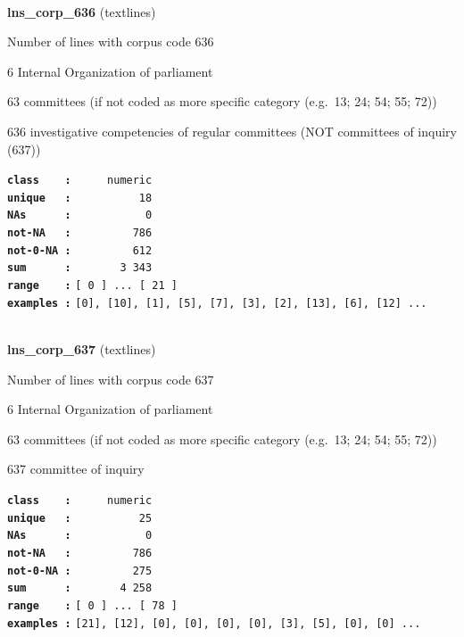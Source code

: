 \documentclass[]{article}
\begin{document}
~

\textbf{lns\_corp\_636} (textlines)

Number of lines with corpus code 636

6 Internal Organization of parliament

63 committees (if not coded as more specific category (e.g.~13; 24; 54;
55; 72))

636 investigative competencies of regular committees (NOT committees of
inquiry (637))

\textbf{\texttt{class\ \ \ \ :}} \texttt{~~~~~numeric}\\
\textbf{\texttt{unique\ \ \ :}} \texttt{~~~~~~~~~~18}\\
\textbf{\texttt{NAs\ \ \ \ \ \ :}} \texttt{~~~~~~~~~~~0}\\
\textbf{\texttt{not-NA\ \ \ :}} \texttt{~~~~~~~~~786}\\
\textbf{\texttt{not-0-NA\ :}} \texttt{~~~~~~~~~612}\\
\textbf{\texttt{sum\ \ \ \ \ \ :}} \texttt{~~~~~~~3~343}\\
\textbf{\texttt{range\ \ \ \ :}}
\texttt{{[}\ 0\ {]}\ ...\ {[}\ 21\ {]}}\\
\textbf{\texttt{examples\ :}}
\texttt{{[}0{]},\ {[}10{]},\ {[}1{]},\ {[}5{]},\ {[}7{]},\ {[}3{]},\ {[}2{]},\ {[}13{]},\ {[}6{]},\ {[}12{]}\ ...}\\

~

\textbf{lns\_corp\_637} (textlines)

Number of lines with corpus code 637

6 Internal Organization of parliament

63 committees (if not coded as more specific category (e.g.~13; 24; 54;
55; 72))

637 committee of inquiry

\textbf{\texttt{class\ \ \ \ :}} \texttt{~~~~~numeric}\\
\textbf{\texttt{unique\ \ \ :}} \texttt{~~~~~~~~~~25}\\
\textbf{\texttt{NAs\ \ \ \ \ \ :}} \texttt{~~~~~~~~~~~0}\\
\textbf{\texttt{not-NA\ \ \ :}} \texttt{~~~~~~~~~786}\\
\textbf{\texttt{not-0-NA\ :}} \texttt{~~~~~~~~~275}\\
\textbf{\texttt{sum\ \ \ \ \ \ :}} \texttt{~~~~~~~4~258}\\
\textbf{\texttt{range\ \ \ \ :}}
\texttt{{[}\ 0\ {]}\ ...\ {[}\ 78\ {]}}\\
\textbf{\texttt{examples\ :}}
\texttt{{[}21{]},\ {[}12{]},\ {[}0{]},\ {[}0{]},\ {[}0{]},\ {[}0{]},\ {[}3{]},\ {[}5{]},\ {[}0{]},\ {[}0{]}\ ...}\\
\end{document}
